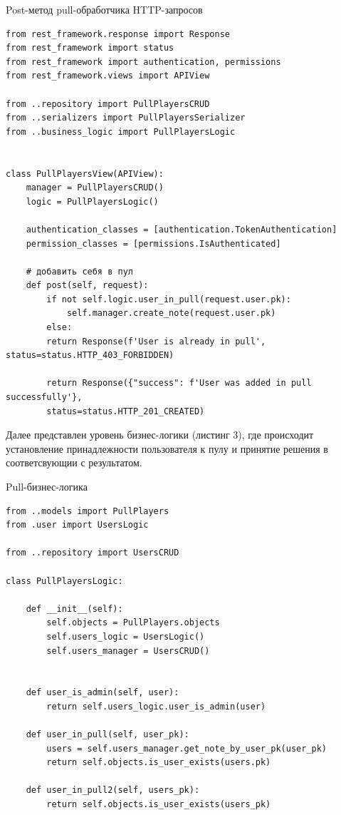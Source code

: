 \documentclass[a4paper,14pt]{extarticle}
\begin{document}
 	\begin{listing}
 		\caption{Post-метод pull-обработчика HTTP-запросов}
 		\label{code:pull_view}
 		\begin{verbatim}
from rest_framework.response import Response
from rest_framework import status
from rest_framework import authentication, permissions
from rest_framework.views import APIView

from ..repository import PullPlayersCRUD
from ..serializers import PullPlayersSerializer
from ..business_logic import PullPlayersLogic


class PullPlayersView(APIView):
	manager = PullPlayersCRUD()
	logic = PullPlayersLogic()
	
	authentication_classes = [authentication.TokenAuthentication]
	permission_classes = [permissions.IsAuthenticated]
	
	# добавить себя в пул
	def post(self, request):
		if not self.logic.user_in_pull(request.user.pk):
			self.manager.create_note(request.user.pk)
		else:
 		return Response(f'User is already in pull', status=status.HTTP_403_FORBIDDEN)
 		
 		return Response({"success": f'User was added in pull successfully'},
 		status=status.HTTP_201_CREATED)
 		\end{verbatim}
 	\end{listing}
 
 	\newpage
 
 	Далее представлен уровень бизнес-логики (листинг 3), где происходит установление принадлежности пользователя к пулу и принятие решения в соответсвующии с результатом.
 	
 	\begin{listing}
 		\caption{Pull-бизнес-логика}
 		\label{code:pull_logic}
 		\begin{verbatim}
from ..models import PullPlayers
from .user import UsersLogic

from ..repository import UsersCRUD

class PullPlayersLogic:

	def __init__(self):
		self.objects = PullPlayers.objects
		self.users_logic = UsersLogic()
		self.users_manager = UsersCRUD()
	
	
	def user_is_admin(self, user):
		return self.users_logic.user_is_admin(user)
	
	def user_in_pull(self, user_pk):
		users = self.users_manager.get_note_by_user_pk(user_pk)
		return self.objects.is_user_exists(users.pk)
	
	def user_in_pull2(self, users_pk):
		return self.objects.is_user_exists(users_pk)
 		\end{verbatim}
 	\end{listing}
 	
\end{document}
